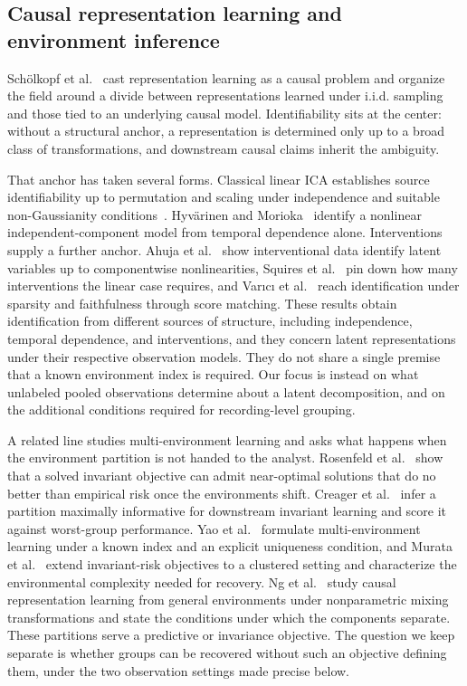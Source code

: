 \subsection{Causal representation learning and environment
inference}\label{causal-representation-learning-and-environment-inference}

Schölkopf et al.~\cite{scholkopf2021} cast
representation learning as a causal problem and organize the field
around a divide between representations learned under i.i.d. sampling
and those tied to an underlying causal model. Identifiability sits at
the center: without a structural anchor, a representation is determined
only up to a broad class of transformations, and downstream causal
claims inherit the ambiguity.

That anchor has taken several forms. Classical linear ICA establishes
source identifiability up to permutation and scaling under independence
and suitable non-Gaussianity
conditions~\cite{comon1994}. Hyvärinen and
Morioka~\cite{hyvarinen2017} identify a nonlinear
independent-component model from temporal dependence alone.
Interventions supply a further anchor. Ahuja et
al.~\cite{ahuja2023} show interventional data identify
latent variables up to componentwise nonlinearities, Squires et
al.~\cite{squires2023} pin down how many interventions
the linear case requires, and Varıcı et
al.~\cite{varici2025} reach identification under
sparsity and faithfulness through score matching. These results obtain
identification from different sources of structure, including
independence, temporal dependence, and interventions, and they concern
latent representations under their respective observation models. They
do not share a single premise that a known environment index is
required. Our focus is instead on what unlabeled pooled observations
determine about a latent decomposition, and on the additional conditions
required for recording-level grouping.

A related line studies multi-environment learning and asks what happens
when the environment partition is not handed to the analyst. Rosenfeld
et al.~\cite{rosenfeld2021} show that a solved invariant
objective can admit near-optimal solutions that do no better than
empirical risk once the environments shift. Creager et
al.~\cite{creager2021} infer a partition maximally
informative for downstream invariant learning and score it against
worst-group performance. Yao et al.~\cite{yao2025}
formulate multi-environment learning under a known index and an explicit
uniqueness condition, and Murata et
al.~\cite{murata2025} extend invariant-risk objectives
to a clustered setting and characterize the environmental complexity
needed for recovery. Ng et al.~\cite{ng2025} study
causal representation learning from general environments under
nonparametric mixing transformations and state the conditions under
which the components separate. These partitions serve a predictive or
invariance objective. The question we keep separate is whether groups
can be recovered without such an objective defining them, under the two
observation settings made precise below.

